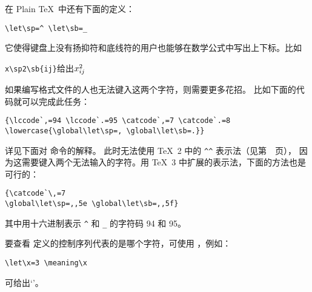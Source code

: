 \documentclass{book}
\begin{document}
在 Plain \TeX\ 中还有下面的定义：
\begin{verbatim}
\let\sp=^ \let\sb=_
\end{verbatim}
它使得键盘上没有扬抑符和底线符的用户也能够在数学公式中写出上下标。比如
\begin{disp}\verb>x\sp2\sb{ij}>\quad 给出\quad $x\sp2\sb{ij}$\end{disp}
如果编写格式文件的人也无法键入这两个字符，则需要更多花招。
比如下面的代码就可以完成此任务：\label{spsb:truc}
\begin{verbatim}
{\lccode`,=94 \lccode`.=95 \catcode`,=7 \catcode`.=8
\lowercase{\global\let\sp=, \global\let\sb=.}}
\end{verbatim}
详见下面对  命令的解释。
此时无法使用 \TeX\ 2 中的 \verb>^^> 表示法（见第~\pageref{hathat}~页），
因为这需要键入两个无法输入的字符。用 \TeX\ 3 中扩展的表示法，下面的方法也是可行的：
\begin{verbatim}
{\catcode`\,=7
\global\let\sp=,,5e \global\let\sb=,,5f}
\end{verbatim}
其中用十六进制表示 \verb-^- 和 \verb-_- 的字符码 94 和 95。

要查看  定义的控制序列代表的是哪个字符，可使用 ，例如：
\begin{verbatim}
\let\x=3 \meaning\x
\end{verbatim}
可给出`'。
\end{document}
